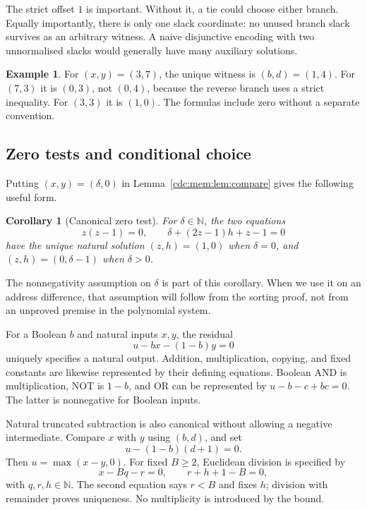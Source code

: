 \documentclass[11pt,a4paper]{article}
\newtheorem{corollary}[corollary]{Corollary}
\theoremstyle{definition}
\newtheorem{example}[example]{Example}
\theoremstyle{remark}
\newcommand{\N}{\mathbb N}
\begin{document}
The strict offset $1$ is important. Without it, a tie could choose either
branch. Equally importantly, there is only one slack coordinate: no unused
branch slack survives as an arbitrary witness. A naive disjunctive encoding
with two unnormalised slacks would generally have many auxiliary solutions.

\begin{example}
For $(x,y)=(3,7)$, the unique witness is $(b,d)=(1,4)$. For $(7,3)$ it is
$(0,3)$, not $(0,4)$, because the reverse branch uses a strict inequality.
For $(3,3)$ it is $(1,0)$. The formulas include zero without a separate
convention.
\end{example}

\subsection{Zero tests and conditional choice}
Putting $(x,y)=(\delta,0)$ in Lemma~\ref{cdc:mem:lem:compare} gives the following useful
form.
\begin{corollary}[Canonical zero test]\label{cdc:mem:cor:zero}
For $\delta\in\N$, the two equations
\begin{equation}\label{cdc:mem:eq:zero}
 z(z-1)=0,\qquad \delta+(2z-1)h+z-1=0
\end{equation}
have the unique natural solution
$(z,h)=(1,0)$ when $\delta=0$, and
$(z,h)=(0,\delta-1)$ when $\delta>0$.
\end{corollary}
The nonnegativity assumption on $\delta$ is part of this corollary. When we use
it on an address difference, that assumption will follow from the sorting
proof, not from an unproved premise in the polynomial system.

For a Boolean $b$ and natural inputs $x,y$, the residual
\begin{equation}\label{cdc:mem:eq:mux}
 u-bx-(1-b)y=0
\end{equation}
uniquely specifies a natural output. Addition, multiplication, copying, and
fixed constants are likewise represented by their defining equations. Boolean
AND is multiplication, NOT is $1-b$, and OR can be represented by
$u-b-c+bc=0$. The latter is nonnegative for Boolean inputs.

Natural truncated subtraction is also canonical without allowing a negative
intermediate. Compare $x$ with $y$ using $(b,d)$, and set
\begin{equation}
 u-(1-b)(d+1)=0.
\end{equation}
Then $u=\max(x-y,0)$. For fixed $B\geq2$, Euclidean division is specified by
\begin{equation}\label{cdc:mem:eq:division}
 x-Bq-r=0,\qquad r+h+1-B=0,
\end{equation}
with $q,r,h\in\N$. The second equation says $r<B$ and fixes $h$; division with
remainder proves uniqueness. No multiplicity is introduced by the bound.
\end{document}
